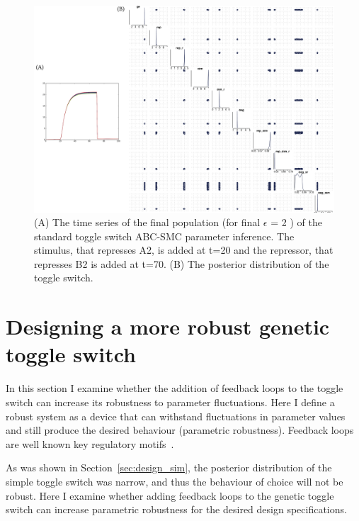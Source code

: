 \begin{figure}[htbp]
    \centering
    \hspace*{-1cm}
    \includegraphics[scale=0.7]{../../chapters/chapterABCSysBio/images/param_inf_res.png}
    \caption[Posterior distribution of the switch obtained from ABC system design]{(A) The time series of the final population (for final $\epsilon$ = 2 ) of the standard toggle switch ABC-SMC parameter inference. The stimulus, that represses A2, is added at t=20 and the repressor, that represses B2 is added at t=70. (B) The posterior distribution of the toggle switch.}
    \label{fig:stand_abc_timeseries}
\end{figure}
\clearpage
    

\section{Designing a more robust genetic toggle switch}

In this section I examine whether the addition of feedback loops to the toggle switch can increase its robustness to parameter fluctuations. Here I define a robust system as a device that can withstand fluctuations in parameter values and still produce the desired behaviour (parametric robustness). Feedback loops are well known key regulatory motifs~\autocite{Brandman:2005ci}. 

As was shown in Section~\ref{sec:design_sim}, the posterior distribution of the simple toggle switch was narrow, and thus the behaviour of choice will not be robust. Here I examine whether adding feedback loops to the genetic toggle switch can increase parametric robustness for the desired design specifications.

